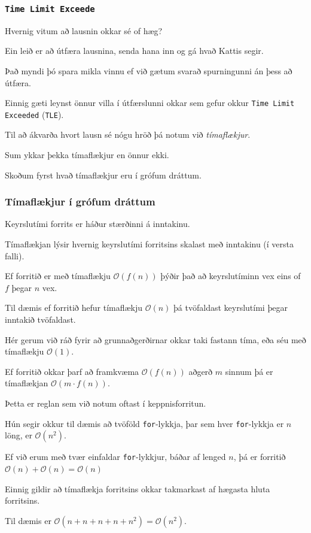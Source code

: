 {
	\frametitle{\texttt{Time Limit Exceede}}
	{
		\item<1-> Hvernig vitum að lausnin okkar sé of hæg?
		\item<2-> Ein leið er að útfæra lausnina, senda hana inn og gá hvað Kattis segir.
		\item<3-> Það myndi þó spara mikla vinnu ef við gætum svarað spurningunni án þess að útfæra.
		\item<4-> Einnig gæti leynst önnur villa í útfærslunni okkar sem gefur okkur \texttt{Time Limit Exceeded} (\texttt{TLE}).
		\item<5-> Til að ákvarða hvort lausn sé nógu hröð þá notum við \emph{tímaflækjur}.
		\item<6-> Sum ykkar þekka tímaflækjur en önnur ekki.
		\item<7-> Skoðum fyrst hvað tímaflækjur eru í grófum dráttum.
	}
}

{
	\frametitle{Tímaflækjur í grófum dráttum}
	{
		\item<1-> Keyrslutími forrits er háður stærðinni á inntakinu.
		\item<2-> Tímaflækjan lýsir hvernig keyrslutími forritsins skalast með inntakinu (í versta falli).
		\item<3-> Ef forritið er með tímaflækju $\mathcal{O}(f(n))$ þýðir það að keyrslutíminn vex eins of $f$ þegar $n$ vex.
		\item<4-> Til dæmis ef forritið hefur tímaflækju $\mathcal{O}(n)$ þá tvöfaldast keyrslutími þegar inntakið tvöfaldast.
		\item<5-> Hér gerum við ráð fyrir að grunnaðgerðirnar okkar taki fastann tíma, eða séu með tímaflækju $\mathcal{O}(1)$.
	}
}

{
	{
		\item<1-> Ef forritið okkar þarf að framkvæma $\mathcal{O}(f(n))$ aðgerð $m$ sinnum þá er tímaflækjan $\mathcal{O}(m \cdot f(n))$.
		\item<2-> Þetta er reglan sem við notum oftast í keppnisforritun.
		\item<3-> Hún segir okkur til dæmis að tvöföld \texttt{for}-lykkja, þar sem hver \texttt{for}-lykkja er $n$ löng, er $\mathcal{O}(n^2)$.
		\item<4-> Ef við erum með tvær einfaldar \texttt{for}-lykkjur, báðar af lenged $n$, þá er forritið 
			$\mathcal{O}(n) + \mathcal{O}(n) = \mathcal{O}(n)$
		\item<5-> Einnig gildir að tímaflækja forritsins okkar takmarkast af hægasta hluta forritsins.
		\item<6-> Til dæmis er
			$\mathcal{O}(n + n + n + n + n^2) = \mathcal{O}(n^2)$.
	}
}


